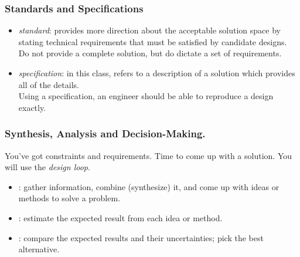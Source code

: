 \begin{frame}
\frametitle{Standards and Specifications}

\begin{changemargin}{1.5cm}
\begin{itemize}
\item \emph{standard}: provides more direction about the acceptable
solution space by stating technical requirements that must be satisfied
by candidate designs. \\[1em]

Do not provide a complete solution, but 
do dictate a set of requirements.\\[1em]

\item \emph{specification}: in this class, refers to a description of a solution
which provides all of the details. \\[1em]

Using a specification, an engineer
should be able to reproduce a design exactly.

\end{itemize}
\end{changemargin}

\end{frame}

\begin{frame}

\frametitle{Synthesis, Analysis and Decision-Making.}

\begin{changemargin}{1.5cm}
You've got constraints and requirements. Time to come up with a solution.
You will use the \emph{design loop}.

\begin{itemize}
\item {}: gather information, combine (synthesize) it, and come up
with ideas or methods to solve a problem.
\item {}: estimate the expected result from each idea or method.
\item {}: compare the expected results and their uncertainties; pick the best alternative.
\end{itemize}
\end{changemargin}

\end{frame}

